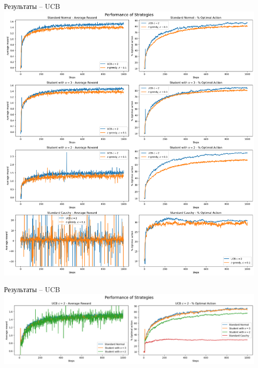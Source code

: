\documentclass[11pt]{beamer} %
\begin{document}
    \begin{frame}{Результаты -- UCB}
        \includegraphics[scale=0.13,center]{images/bandit_tester/ucb_1.png}
    \end{frame}
    \begin{frame}{Результаты -- UCB}
        \includegraphics[scale=0.13,center]{images/bandit_tester/ucb_2.png}
    \end{frame}
\end{document}
